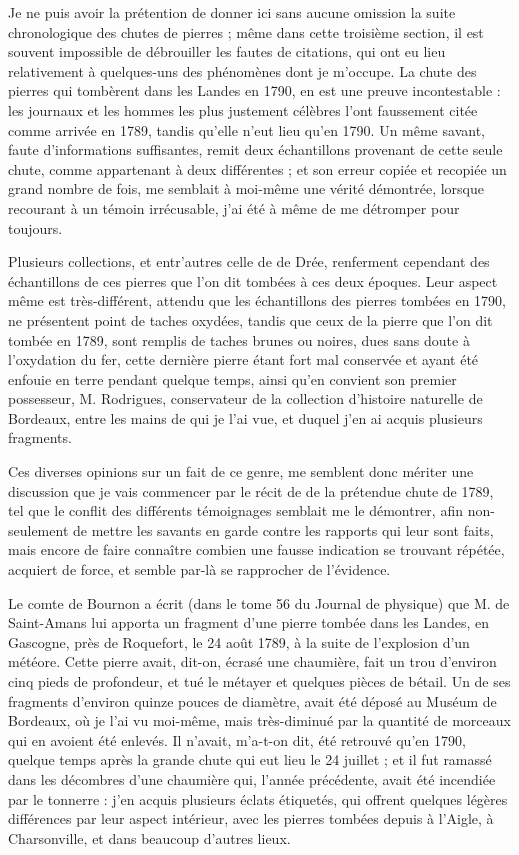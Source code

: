\documentclass[a4paper, 12pt, oneside, french]{article}
\begin{document}
Je ne puis avoir la prétention de donner ici sans aucune omission la suite chronologique des chutes de pierres ; même dans cette troisième section, il est souvent impossible de débrouiller les fautes de citations, qui ont eu lieu relativement à quelques-uns des phénomènes dont je m'occupe. La chute des pierres qui tombèrent dans les Landes en 1790, en est une preuve incontestable : les journaux et les hommes les plus justement célèbres l'ont faussement citée comme arrivée en 1789, tandis qu'elle n'eut lieu qu'en 1790. Un même savant, faute d'informations suffisantes, remit deux échantillons provenant de cette seule chute, comme appartenant à deux différentes ; et son erreur copiée et recopiée un grand nombre de fois, me semblait à moi-même une vérité démontrée, lorsque recourant à un témoin irrécusable, j'ai été à même de me détromper pour toujours.

Plusieurs collections, et entr'autres celle de de Drée, renferment cependant des échantillons de ces pierres que l'on dit tombées à ces deux époques. Leur aspect même est très-différent, attendu que les échantillons des pierres tombées en 1790, ne présentent point de taches oxydées, tandis que ceux de la pierre que l'on dit tombée en 1789, sont remplis de taches brunes ou noires, dues sans doute à l'oxydation du fer, cette dernière pierre étant fort mal conservée et ayant été enfouie en terre pendant quelque temps, ainsi qu'en convient son premier possesseur, M. Rodrigues, conservateur de la collection d'histoire naturelle de Bordeaux, entre les mains de qui je l'ai vue, et duquel j'en ai acquis plusieurs fragments.

Ces diverses opinions sur un fait de ce genre, me semblent donc mériter une discussion que je vais commencer par le récit de de la prétendue chute de 1789, tel que le conflit des différents témoignages semblait me le démontrer, afin non-seulement de mettre les savants en garde contre les rapports qui leur sont faits, mais encore de faire connaître combien une fausse indication se trouvant répétée, acquiert de force, et semble par-là se rapprocher de l'évidence.

Le comte de Bournon a écrit (dans le tome 56 du Journal de physique) que M. de Saint-Amans lui apporta un fragment d'une pierre tombée dans les Landes, en Gascogne, près de Roquefort, le 24 août 1789, à la suite de l'explosion d'un météore. Cette pierre avait, dit-on, écrasé une chaumière, fait un trou d'environ cinq pieds de profondeur, et tué le métayer et quelques pièces de bétail. Un de ses fragments d'environ quinze pouces de diamètre, avait été déposé au Muséum de Bordeaux, où je l'ai vu moi-même, mais très-diminué par la quantité de morceaux qui en avoient été enlevés. Il n'avait, m'a-t-on dit, été retrouvé qu'en 1790, quelque temps après la grande chute qui eut lieu le 24 juillet ; et il fut ramassé dans les décombres d'une chaumière qui, l'année précédente, avait été incendiée par le tonnerre : j'en acquis plusieurs éclats étiquetés, qui offrent quelques légères différences par leur aspect intérieur, avec les pierres tombées depuis à l'Aigle, à Charsonville, et dans beaucoup d'autres lieux.
\end{document}
